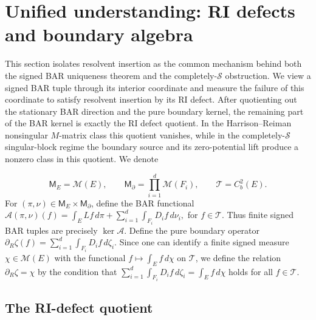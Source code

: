 \documentclass[aihp]{imsart}
\numberwithin{equation}{section}
\theoremstyle{plain}
\theoremstyle{definition}
\newcommand{\cM}{\mathcal M}
\newcommand{\1}{\mathbf 1}
\begin{document}
\section{Unified understanding: RI defects and boundary algebra}\label{sec:unified-understanding}

This section isolates resolvent insertion as the common mechanism behind both the signed BAR uniqueness theorem and the completely-\(\mathcal S\) obstruction.  We view a signed BAR tuple through its interior coordinate and measure the failure of this coordinate to satisfy resolvent insertion by its RI defect.  After quotienting out the stationary BAR direction and the pure boundary kernel, the remaining part of the BAR kernel is exactly the RI defect quotient.  In the Harrison--Reiman nonsingular \(M\)-matrix class this quotient vanishes, while in the completely-\(\mathcal S\) singular-block regime the boundary source and its zero-potential lift produce a nonzero class in this quotient. We denote


\[
 \mathsf M_E=\cM(E),
 \qquad
 \mathsf M_\partial=\prod_{i=1}^d \cM(F_i),
 \qquad
 \mathcal T=C_b^2(E).
\]
For $(\pi,\nu)\in \mathsf M_E\times\mathsf M_\partial$, define the BAR functional $\mathcal A(\pi,\nu)(f)
 =\int_E Lf\,d\pi+
   \sum_{i=1}^d\int_{F_i}D_i f\,d\nu_i,$ for $f\in\mathcal T$. Thus finite signed BAR tuples are precisely $\ker\mathcal A$.  Define the pure boundary operator $\partial_R\zeta(f)
 =\sum_{i=1}^d\int_{F_i}D_i f\,d\zeta_i$. Since one can identify a finite signed measure $\chi\in\cM(E)$ with the functional $f\mapsto\int_E f\,d\chi$ on $\mathcal T$, we define the relation $\partial_R\zeta=\chi$ by the condition that $ \sum_{i=1}^d\int_{F_i}D_i f\,d\zeta_i
 =\int_E f\,d\chi$ holds for all $f\in\mathcal T$. 

\subsection{The RI-defect quotient}
\end{document}
